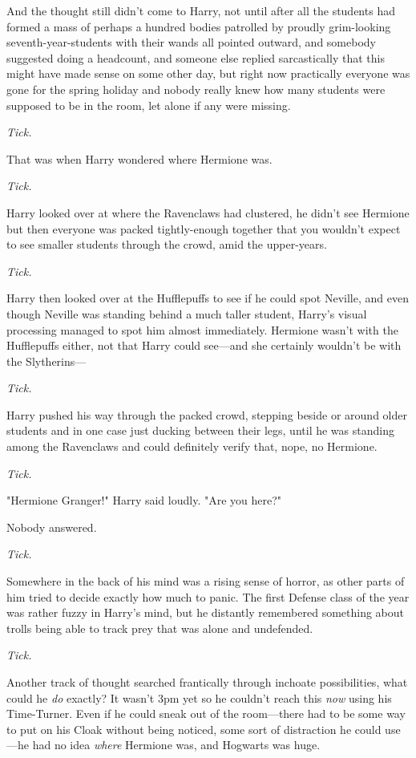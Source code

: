 And the thought still didn't come to Harry, not until after all the students 
had formed a mass of perhaps a hundred bodies patrolled by proudly grim-looking 
seventh-year-students with their wands all pointed outward, and somebody 
suggested doing a headcount, and someone else replied sarcastically that this 
might have made sense on some other day, but right now practically everyone was 
gone for the spring holiday and nobody really knew how many students were 
supposed to be in the room, let alone if any were missing.

\emph{Tick.}

That was when Harry wondered where Hermione was.

\emph{Tick.}

Harry looked over at where the Ravenclaws had clustered, he didn't see Hermione 
but then everyone was packed tightly-enough together that you wouldn't expect 
to see smaller students through the crowd, amid the upper-years.

\emph{Tick.}

Harry then looked over at the Hufflepuffs to see if he could spot Neville, and 
even though Neville was standing behind a much taller student, Harry's visual 
processing managed to spot him almost immediately. Hermione wasn't with the 
Hufflepuffs either, not that Harry could see---and she certainly wouldn't be 
with the Slytherins---

\emph{Tick.}

Harry pushed his way through the packed crowd, stepping beside or around older 
students and in one case just ducking between their legs, until he was standing 
among the Ravenclaws and could definitely verify that, nope, no Hermione.

\emph{Tick.}

"Hermione Granger!" Harry said loudly. "Are you here?"

Nobody answered.

\emph{Tick.}

Somewhere in the back of his mind was a rising sense of horror, as other parts 
of him tried to decide exactly how much to panic. The first Defense class of 
the year was rather fuzzy in Harry's mind, but he distantly remembered 
something about trolls being able to track prey that was alone and undefended.

\emph{Tick.}

Another track of thought searched frantically through inchoate possibilities, 
what could he \emph{do} exactly? It wasn't 3pm yet so he couldn't reach this 
\emph{now} using his Time-Turner. Even if he could sneak out of the 
room---there had to be some way to put on his Cloak without being noticed, some 
sort of distraction he could use---he had no idea \emph{where} Hermione was, 
and Hogwarts was huge.

